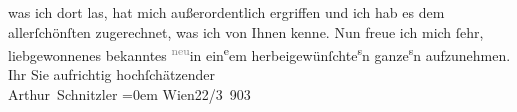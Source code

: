 \begin{ledgroupsized}[t]{13cm}
                    was ich dort las, hat mich außerordentlich ergriffen und ich hab es dem
                    allerſchönſten zugerechnet, was ich von Ihnen {\pb}kenne.
                    Nun freue ich mich ſehr, liebgewonnenes bekanntes \substVorne{}\textsuperscript{\textcolor{gray}{neu}}\substDazwischen{}in\substHinten{} ein\substVorne{}\textsuperscript{e}\substDazwischen{}em\substHinten{} herbeigewünſchte\substVorne{}\textsuperscript{s}\substDazwischen{}n\substHinten{} ganze\substVorne{}\textsuperscript{s}\substDazwischen{}n\substHinten{} aufzunehmen.\pend
           \pstart
           Ihr Sie aufrichtig hochſchätzender{\\[\baselineskip]}\spacefill\mbox{Arthur Schnitzler}\pend
           \leftskip=0em{}\pstart
           Wien22/3 903\pend
           \endnumbering{}\end{ledgroupsized}  \newcommand{\dateiname}{L01278}\newcommand{\titel}{Arthur Schnitzler an Richard Dehmel, 22. 3. 1903}\newcommand{\editorInnen}{ Martin Anton Müller und Gerd-Hermann Susen}
      